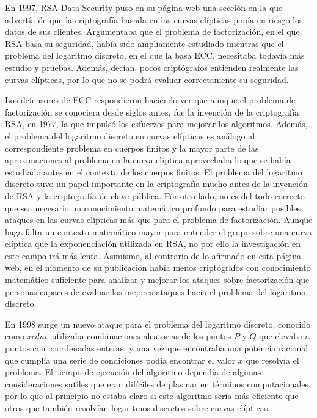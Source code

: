 \documentclass[
  a4paper,
  12pt,
  spanish,
]{scrartcl}
\begin{document}
En 1997, RSA Data Security puso en su página web una sección en la que advertía de que la criptografía basada en las curvas elípticas ponía en riesgo los datos de sus clientes. Argumentaba que el problema de factorización, en el que RSA basa su seguridad, había sido ampliamente estudiado mientras que el problema del logaritmo discreto, en el que la basa ECC, necesitaba todavía más estudio y pruebas. Además, decían, pocos criptógrafos entienden realmente las curvas elípticas, por lo que no se podrá evaluar correctamente su seguridad.

Los defensores de ECC respondieron haciendo ver que aunque el problema de factorización se conociera desde siglos antes, fue la invención de la criptografía RSA, en 1977, la que impulsó los esfuerzos para mejorar los algoritmos. Además, el problema del logaritmo discreto en curvas elípticas es análogo al correspondiente problema en cuerpos finitos y la mayor parte de las aproximaciones al problema en la curva elíptica aprovechaba lo que se había estudiado antes en el contexto de los cuerpos finitos. El problema del logaritmo discreto tuvo un papel importante en la criptografía mucho antes de la invención de RSA y la criptografía de clave pública. Por otro lado, no es del todo correcto que sea necesario un conocimiento matemático profundo para estudiar posibles ataques en las curvas elípticas más que para el problema de factorización. Aunque haga falta un contexto matemático mayor para entender el grupo sobre una curva elíptica que la exponenciación utilizada en RSA, no por ello la investigación en este campo irá más lenta. Asimismo, al contrario de lo afirmado en esta página web, en el momento de su publicación había menos criptógrafos con conocimiento matemático suficiente para analizar y mejorar los ataques sobre factorización que personas capaces de evaluar los mejores ataques hacia el problema del logaritmo discreto.

En 1998 surge un nuevo ataque para el problema del logaritmo discreto, conocido como \textit{xedni}. utilizaba combinaciones aleatorias de los puntos $P$ y $Q$ que elevaba a puntos con coordenadas enteras, y una vez que encontraba una potencia racional que cumplía una serie de condiciones podía encontrar el valor $x$ que resolvía el problema. El tiempo de ejecución del algoritmo dependía de algunas consideraciones sutiles que eran difíciles de plasmar en términos computacionales, por lo que al principio no estaba claro si este algoritmo sería más eficiente que otros que también resolvían logaritmos discretos sobre curvas elípticas.
\end{document}
